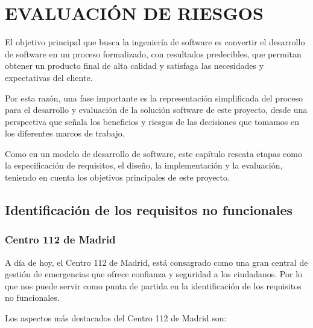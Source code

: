 \chapter{EVALUACIÓN DE RIESGOS\label{sec:disenho}}

El objetivo principal que busca la ingeniería de software es convertir el desarrollo de software en un proceso formalizado, con resultados predecibles, que permitan obtener un producto final de alta calidad y satisfaga las necesidades y expectativas del cliente.

Por esta razón, una fase importante es la representación simplificada del proceso para el desarrollo y evaluación de la solución software de este proyecto, desde una perspectiva que señala los beneficios y riesgos de las decisiones que tomamos en los diferentes marcos de trabajo.

Como en un modelo de desarrollo de software, este capítulo rescata etapas como la especificación de requisitos, el diseño, la implementación y la evaluación, teniendo en cuenta los objetivos principales de este proyecto.

\clearpage

\section{Identificación de los requisitos no funcionales}

\subsection{Centro 112 de Madrid}

A día de hoy, el Centro 112 de Madrid, está consagrado como una gran central de gestión de emergencias que ofrece confianza y seguridad a los ciudadanos. Por lo que nos puede servir como punta de partida en la identificación de los requisitos no funcionales.

Los aspectos más destacados del Centro 112 de Madrid son:

